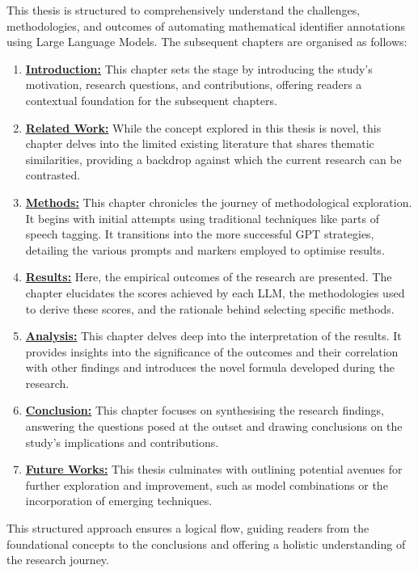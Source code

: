 This thesis is structured to comprehensively understand the challenges, methodologies, and outcomes of automating mathematical identifier annotations using Large Language Models. The subsequent chapters are organised as follows:

\begin{enumerate}
    \item \textbf{\hyperref[chapter:introduction]{Introduction:}}  This chapter sets the stage by introducing the study's motivation, research questions, and contributions, offering readers a contextual foundation for the subsequent chapters.
    
    \item \textbf{\hyperref[chapter:related_work]{Related Work:}} While the concept explored in this thesis is novel, this chapter delves into the limited existing literature that shares thematic similarities, providing a backdrop against which the current research can be contrasted.
    
    \item \textbf{\hyperref[chapter:methods]{Methods:}} This chapter chronicles the journey of methodological exploration. It begins with initial attempts using traditional techniques like parts of speech tagging. It transitions into the more successful GPT strategies, detailing the various prompts and markers employed to optimise results.
    
    \item \textbf{\hyperref[chapter:results]{Results:}} Here, the empirical outcomes of the research are presented. The chapter elucidates the scores achieved by each LLM, the methodologies used to derive these scores, and the rationale behind selecting specific methods.
    
    \item \textbf{\hyperref[chapter:analysis]{Analysis:}} This chapter delves deep into the interpretation of the results. It provides insights into the significance of the outcomes and their correlation with other findings and introduces the novel formula developed during the research.
    
    \item \textbf{\hyperref[chapter:conclusion]{Conclusion:}} This chapter focuses on synthesising the research findings, answering the questions posed at the outset and drawing conclusions on the study's implications and contributions.
    
    \item \textbf{\hyperref[chapter:future_works]{Future Works:}} This thesis culminates with outlining potential avenues for further exploration and improvement, such as model combinations or the incorporation of emerging techniques.
    
    
\end{enumerate}

This structured approach ensures a logical flow, guiding readers from the foundational concepts to the conclusions and offering a holistic understanding of the research journey.
